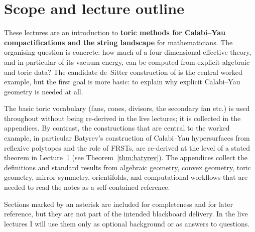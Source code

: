 
\section*{Scope and lecture outline}
{}

These lectures are an introduction to \textbf{toric methods for
Calabi--Yau compactifications and the string landscape} for
mathematicians.  The organising
question is concrete: how much of a four-dimensional effective theory,
and in particular of its vacuum energy, can be computed from explicit
algebraic and toric data?  The candidate de~Sitter construction of
\cite{McAllister:2024lnt} is the central worked example, but the first
goal is more basic: to explain why explicit Calabi--Yau geometry is
needed at all.

The basic toric vocabulary (fans, cones, divisors, the secondary
fan etc.) is used throughout without being re-derived in the live
lectures; it is collected in the appendices. By contrast, the
constructions that are central to the worked example, in particular
Batyrev's construction of Calabi--Yau hypersurfaces from reflexive
polytopes and the role of FRSTs, are re-derived at the level of a
stated theorem in Lecture~1 (see Theorem~\ref{thm:batyrev}). The
appendices collect the definitions and standard results from algebraic
geometry, convex geometry, toric geometry, mirror symmetry,
orientifolds, and computational workflows that are needed to read the
notes as a self-contained reference.

Sections marked by an asterisk are included for completeness and for
later reference, but they are not part of the intended blackboard
delivery. In the live lectures I will use them only as optional
background or as answers to questions.

